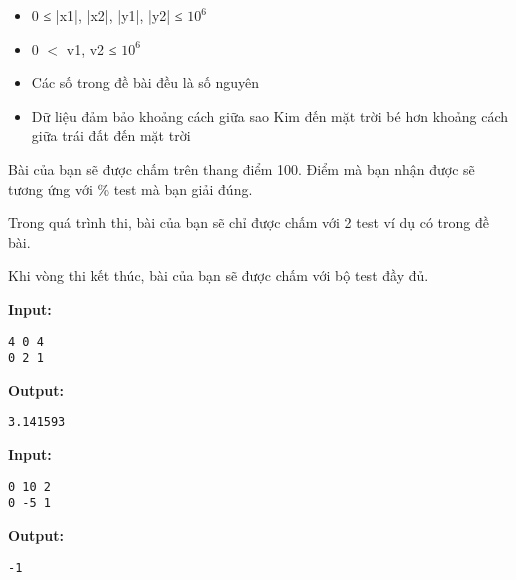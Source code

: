 \begin{itemize}
	\item     0 ≤ |x1|, |x2|, |y1|, |y2| ≤ $10^{6}$
	\item     0 $<$ v1, v2 ≤ $10^{6}$
	\item     Các số trong đề bài đều là số nguyên   
	\item      Dữ liệu đảm bảo khoảng cách giữa sao Kim đến mặt trời bé hơn khoảng cách giữa trái đất đến mặt trời    
\end{itemize}
Bài của bạn sẽ được chấm trên thang điểm 100. Điểm mà bạn nhận được sẽ tương ứng với \% test mà bạn giải đúng.  

   Trong quá trình thi, bài của bạn sẽ chỉ được chấm với 2 test ví dụ có trong đề bài.  

   Khi vòng thi kết thúc, bài của bạn sẽ được chấm với bộ test đầy đủ.  
\begin{itemize}
\end{itemize}
\textbf{    Input:   }
\begin{verbatim}
4 0 4
0 2 1\end{verbatim}

\textbf{    Output:   }
\begin{verbatim}
3.141593

\end{verbatim}



\textbf{    Input:   }
\begin{verbatim}
0 10 2
0 -5 1\end{verbatim}

\textbf{    Output:   }
\begin{verbatim}
-1\end{verbatim}